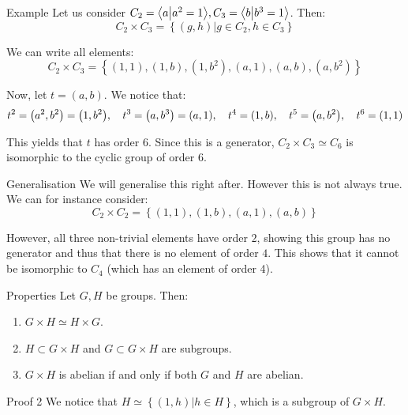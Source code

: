 \documentclass[a4paper]{article}
\begin{document}
\begin{parag}{Example}
    Let us consider $C_2 = \braket{a}{a^2 = 1}, C_3 = \braket{b}{b^3 = 1}$. Then: 
    \[C_2 \times C_3 = \left\{\left(g, h\right) | g \in C_2, h \in C_3\right\}\]
    
    We can write all elements: 
    \[C_2 \times C_3 = \left\{\left(1, 1\right), \left(1, b\right), \left(1, b^2\right), \left(a, 1\right), \left(a, b\right), \left(a, b^2\right)\right\}\]
    
    Now, let $t = \left(a, b\right)$. We notice that: 
    \[t^2 = \left(a^2, b^2\right) = \left(1, b^2\right), \mathspace t^3 = \left(a, b^3\right) = \left(a, 1\right), \mathspace t^4 = \left(1, b\right), \mathspace t^5 = \left(a, b^2\right), \mathspace t^6 = \left(1, 1\right)\]
    
    This yields that $t$ has order $6$. Since this is a generator, $C_2 \times C_3 \simeq C_6$ is isomorphic to the cyclic group of order $6$.
    
    \begin{subparag}{Generalisation}
         We will generalise this right after. However this is not always true. We can for instance consider: 
         \[C_2 \times C_2 = \left\{\left(1, 1\right), \left(1, b\right), \left(a, 1\right), \left(a, b\right)\right\}\]

         However, all three non-trivial elements have order $2$, showing this group has no generator and thus that there is no element of order $4$. This shows that it cannot be isomorphic to $C_4$ (which has an element of order 4).
    \end{subparag}
\end{parag}

\begin{parag}{Properties}
    Let $G, H$ be groups. Then:
    \begin{enumerate}[left=0pt]
        \item $G \times H \simeq H \times G$.
        \item $H \subset G \times H$ and $G \subset G \times H$ are subgroups.
        \item $G \times H$ is abelian if and only if both $G$ and $H$ are abelian.
    \end{enumerate}

    \begin{subparag}{Proof 2}
        We notice that $H \simeq \left\{\left(1, h\right) | h \in H\right\}$, which is a subgroup of $G \times H$.
    \end{subparag}
\end{parag}
\end{document}
